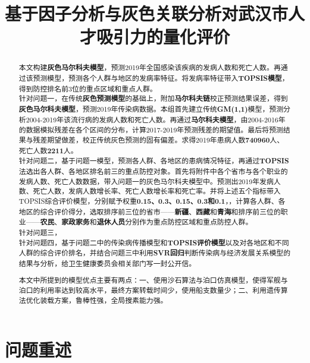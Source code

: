 \documentclass{whutmod}
\title{基于因子分析与灰色关联分析对武汉市人才吸引力的量化评价}
\begin{document}
	
	\begin{abstract}

本文构建\textbf{灰色马尔科夫模型}，预测2019年全国感染该疾病的发病人数和死亡人数。再通过该预测模型，预测各个人群与地区的发病率特征。将发病率特征带入\textbf{TOPSIS模型}，得到防控排名前$3$位的重点区域和重点人群。
~\\

针对问题一，在传统\textbf{灰色预测模型}的基础上，附加\textbf{马尔科夫链}校正预测结果误差，得到\textbf{灰色马尔科夫模型}，预测2019年传染病数据。本组首先建立传统\textbf{GM(1,1)}模型，预测分析2004-2019年该流行病的发病人数和死亡人数。再通过\textbf{马尔科夫模型}，由2004-2016年的数据模拟残差在各个区间的分布，计算2017-2019年预测残差的期望值。最后将预测结果与残差期望做差，校正传统灰色预测的固有偏差。求得2019年患病人数\textbf{740960}人、死亡人数\textbf{2211}人。	
~\\

针对问题二，基于问题一模型，预测各人群、各地区的患病情况特征，再通过\textbf{TOPSIS}法选出各人群、各地区排名前三的重点防控对象。首先将附件中各个省市与各个职业的发病人数、死亡人数数据，带入问题一的灰色马尔科夫模型中。预测出2019年发病人数、死亡人数，发病人数增长率、死亡人数增长率和死亡率。并将上述五个指标带入TOPSIS综合评价模型，分别赋予权重\textbf{0.15、0.3、0.15、0.3和0.1}，，计算各人群、各地区的综合评价得分，选取排序前三位的省市——\textbf{新疆}、\textbf{西藏}和\textbf{青海}和排序前三位的职业——\textbf{农民}、\textbf{家政家务}和\textbf{退休人员}分别作为重点防控区域和重点防控人群。
~\\

针对问题三，
~\\

针对问题四，基于问题二中的传染病传播模型和\textbf{TOPSIS评价模型}以及对各地区和不同人群的综合评价排名，并结合问题三中利用\textbf{SVR回归}判断传染病与经济发展关系模型的结果与分析，给卫生健康委员会相关部门写一封公开信。

本文中所提到的模型优点主要有两点：一、使用沙石算法与泊口仿真模型，使得军舰与泊口的利用率达到较高水平，最终方案转载时间少，使用船支数量少；二、利用遗传算法优化装载方案，鲁棒性强，全局搜素能力强。

	
  


	\end{abstract}
	\tableofcontents
	\newpage	%
	
	\section{问题重述}	
\end{document}
